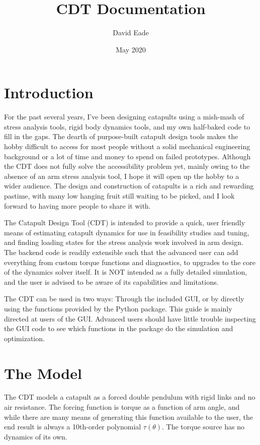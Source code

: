 \documentclass{article}
\title{CDT Documentation}
\author{David Eade}
\date{May 2020}
\begin{document}
\maketitle

\section{Introduction}
For the past several years, I've been designing catapults using a mish-mash of stress analysis tools, rigid body dynamics tools, and my own half-baked code to fill in the gaps. The dearth of purpose-built catapult design tools makes the hobby difficult to access for most people without a solid mechanical engineering background or a lot of time and money to spend on failed prototypes. Although the CDT does not fully solve the accessibility problem yet, mainly owing to the absence of an arm stress analysis tool, I hope it will open up the hobby to a wider audience. The design and construction of catapults is a rich and rewarding pastime, with many low hanging fruit still waiting to be picked, and I look forward to having more people to share it with.\par
The Catapult Design Tool (CDT) is intended to provide a quick, user friendly means of estimating catapult dynamics for use in feasibility studies and tuning, and finding loading states for the stress analysis work involved in arm design. The backend code is readily extensible such that the advanced user can add everything from custom torque functions and diagnostics, to upgrades to the core of the dynamics solver itself. It is NOT intended as a fully detailed simulation, and the user is advised to be aware of its capabilities and limitations.\par
The CDT can be used in two ways: Through the included GUI, or by directly using the functions provided by the Python package. This guide is mainly directed at users of the GUI. Advanced users should have little trouble inspecting the GUI code to see which functions in the package do the simulation and optimization.

\section{The Model}
The CDT models a catapult as a forced double pendulum with rigid links and no air resistance.  The forcing function is torque as a function of arm angle, and while there are many means of generating this function available to the user, the end result is always a 10th-order polynomial $\tau(\theta)$. The torque source has no dynamics of its own.\\
\end{document}
